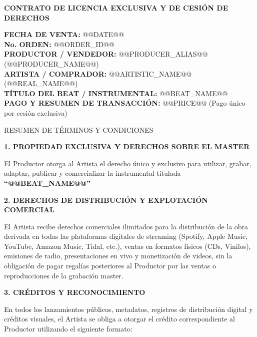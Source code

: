 \documentclass[11pt]{article}
\begin{document}
{\Large\bfseries CONTRATO DE LICENCIA EXCLUSIVA Y DE CESIÓN DE DERECHOS}

\vspace{14pt}

\begin{flushright}
\textbf{FECHA DE VENTA:} @@DATE@@\\[6pt]
\textbf{No. ORDEN:} @@ORDER_ID@@\\[6pt]
\textbf{PRODUCTOR / VENDEDOR:} @@PRODUCER_ALIAS@@ (@@PRODUCER_NAME@@)\\[6pt]
\textbf{ARTISTA / COMPRADOR:} @@ARTISTIC_NAME@@ (@@REAL_NAME@@)\\[6pt]
\textbf{TÍTULO DEL BEAT / INSTRUMENTAL:} @@BEAT_NAME@@\\[6pt]
\textbf{PAGO Y RESUMEN DE TRANSACCIÓN:} @@PRICE@@ (Pago único por cesión exclusiva)
\end{flushright}

\vspace{16pt}

RESUMEN DE TÉRMINOS Y CONDICIONES

\vspace{10pt}

\textbf{1. \quad PROPIEDAD EXCLUSIVA Y DERECHOS SOBRE EL MASTER}

\vspace{4pt}
El Productor otorga al Artista el derecho único y exclusivo para utilizar, grabar, adaptar, publicar y comercializar la instrumental titulada \textbf{``@@BEAT_NAME@@''}

\vspace{12pt}

\textbf{2. \quad DERECHOS DE DISTRIBUCIÓN Y EXPLOTACIÓN COMERCIAL}

\vspace{4pt}
El Artista recibe derechos comerciales ilimitados para la distribución de la obra derivada en todas las plataformas digitales de streaming (Spotify, Apple Music, YouTube, Amazon Music, Tidal, etc.), ventas en formatos físicos (CDs, Vinilos), emisiones de radio, presentaciones en vivo y monetización de videos, sin la obligación de pagar regalías posteriores al Productor por las ventas o reproducciones de la grabación master.

\vspace{12pt}

\textbf{3. \quad CRÉDITOS Y RECONOCIMIENTO}

\vspace{4pt}
En todos los lanzamientos públicos, metadatos, registros de distribución digital y créditos visuales, el Artista se obliga a otorgar el crédito correspondiente al Productor utilizando el siguiente formato:
\end{document}
